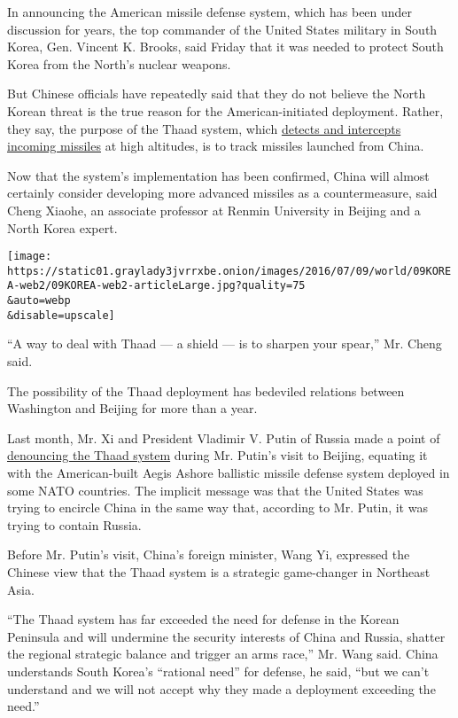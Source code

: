 In announcing the American missile defense system, which has been under
discussion for years, the top commander of the United States military in
South Korea, Gen. Vincent K. Brooks, said Friday that it was needed to
protect South Korea from the North's nuclear weapons.

But Chinese officials have repeatedly said that they do not believe the
North Korean threat is the true reason for the American-initiated
deployment. Rather, they say, the purpose of the Thaad system, which
\href{http://blogs.cfr.org/davidson/2015/03/26/korea-not-a-shrimp-anymore/}{detects
and intercepts incoming missiles} at high altitudes, is to track
missiles launched from China.

Now that the system's implementation has been confirmed, China will
almost certainly consider developing more advanced missiles as a
countermeasure, said Cheng Xiaohe, an associate professor at Renmin
University in Beijing and a North Korea expert.

\texttt{[image: https://static01.graylady3jvrrxbe.onion/images/2016/07/09/world/09KOREA-web2/09KOREA-web2-articleLarge.jpg?quality=75\\\&auto=webp\\\&disable=upscale]}

``A way to deal with Thaad --- a shield --- is to sharpen your spear,''
Mr. Cheng said.

The possibility of the Thaad deployment has bedeviled relations between
Washington and Beijing for more than a year.

Last month, Mr. Xi and President Vladimir V. Putin of Russia made a
point of
\href{http://news.xinhuanet.com/english/2016-06/26/c_135466187.htm}{denouncing
the Thaad system} during Mr. Putin's visit to Beijing, equating it with
the American-built Aegis Ashore ballistic missile defense system
deployed in some NATO countries. The implicit message was that the
United States was trying to encircle China in the same way that,
according to Mr. Putin, it was trying to contain Russia.

Before Mr. Putin's visit, China's foreign minister, Wang Yi, expressed
the Chinese view that the Thaad system is a strategic game-changer in
Northeast Asia.

``The Thaad system has far exceeded the need for defense in the Korean
Peninsula and will undermine the security interests of China and Russia,
shatter the regional strategic balance and trigger an arms race,'' Mr.
Wang said. China understands South Korea's ``rational need'' for
defense, he said, ``but we can't understand and we will not accept why
they made a deployment exceeding the need.''

